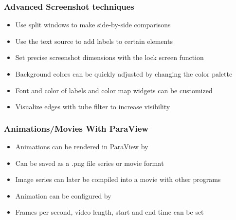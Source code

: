 \begin{frame}
  \frametitle{Advanced Screenshot techniques}
    \begin{itemize}
      \item Use split windows to make side-by-side comparisons
      \item Use the text source to add labels to certain elements
      \item Set precise screenshot dimensions with the lock screen function
      \item Background colors can be quickly adjusted by changing the color palette
      \item Font and color of labels and color map widgets can be customized
      \item Visualize edges with tube filter to increase visibility
    \end{itemize}
\end{frame}

\begin{frame}
  \frametitle{Animations/Movies With ParaView}
    \begin{itemize}
      \item Animations can be rendered in ParaView by 
      \item Can be saved as a .png file series or movie format 
      \item Image series can later be compiled into a movie with other programs 
      \item Animation can be configured by 
      \item Frames per second, video length, start and end time can be set
    \end{itemize}
\end{frame}

